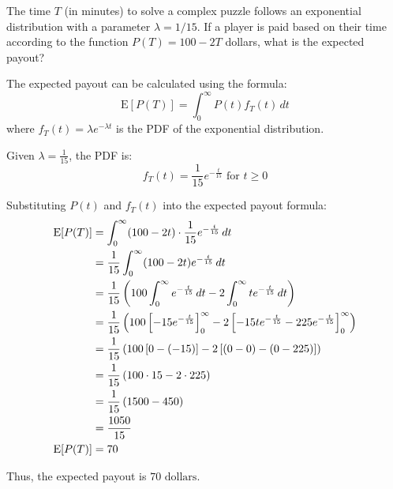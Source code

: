 \documentclass[a4paper, 10pt]{article}
\begin{document}
\newpage

\begin{problem}
The time \( T \) (in minutes) to solve a complex puzzle follows an exponential distribution with a parameter \( \lambda = 1/15 \).
If a player is paid based on their time according to the function \( P(T) = 100 - 2T \) dollars, what is the expected payout?
\end{problem}

\begin{solution}
The expected payout can be calculated using the formula:
\[ \text{E}[P(T)] = \int_{0}^{\infty} P(t) f_T(t) \, dt \]
where \( f_T(t) = \lambda e^{-\lambda t} \) is the PDF of the exponential distribution.

Given \( \lambda = \frac{1}{15} \), the PDF is:
\[ f_T(t) = \frac{1}{15} e^{-\frac{t}{15}} \text{ for } t \geq 0 \]

Substituting \( P(t) \) and \( f_T(t) \) into the expected payout formula:
\begin{align*}
    \text{E}[P(T)] &= \int_{0}^{\infty} (100 - 2t) \cdot \frac{1}{15} e^{-\frac{t}{15}} \, dt \\
    &= \frac{1}{15} \int_{0}^{\infty} (100 - 2t) e^{-\frac{t}{15}} \, dt \\
    &= \frac{1}{15} \left(100 \int_{0}^{\infty} e^{-\frac{t}{15}} \, dt - 2 \int_{0}^{\infty} t e^{-\frac{t}{15}} \, dt\right) \\
    &= \frac{1}{15} \left(100 \left[-15e^{-\frac{t}{15}}\right]_{0}^{\infty} - 2 \left[-15te^{-\frac{t}{15}} - 225e^{-\frac{t}{15}}\right]_{0}^{\infty}\right) \\
    &= \frac{1}{15} \left(100 \left[0 - (-15)\right] - 2 \left[(0 - 0) - (0 - 225)\right]\right) \\
    &= \frac{1}{15} \left(100 \cdot 15 - 2 \cdot 225\right) \\
    &= \frac{1}{15} \left(1500 - 450\right) \\
    &= \frac{1050}{15} \\
    \text{E}[P(T)] &= 70
\end{align*}

Thus, the expected payout is \( \boxed{70 \text{ dollars}} \).
\end{solution}
\end{document}
